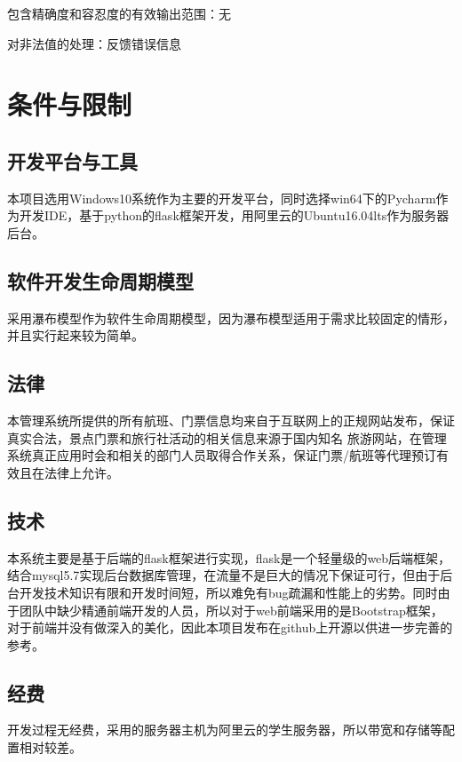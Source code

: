 		包含精确度和容忍度的有效输出范围：无

		对非法值的处理：反馈错误信息


\newpage
\section{条件与限制}
\subsection{开发平台与工具}
本项目选用Windows10系统作为主要的开发平台，同时选择win64下的Pycharm作为开发IDE，基于python的flask框架开发，用阿里云的Ubuntu16.04lts作为服务器后台。
\subsection{软件开发生命周期模型}
采用瀑布模型作为软件生命周期模型，因为瀑布模型适用于需求比较固定的情形，并且实行起来较为简单。
\subsection{法律}
本管理系统所提供的所有航班、门票信息均来自于互联网上的正规网站发布，保证真实合法，景点门票和旅行社活动的相关信息来源于国内知名
旅游网站，在管理系统真正应用时会和相关的部门人员取得合作关系，保证门票/航班等代理预订有效且在法律上允许。
\subsection{技术}
本系统主要是基于后端的flask框架进行实现，flask是一个轻量级的web后端框架，结合mysql5.7实现后台数据库管理，在流量不是巨大的情况下保证可行，但由于后台开发技术知识有限和开发时间短，所以难免有bug疏漏和性能上的劣势。同时由于团队中缺少精通前端开发的人员，所以对于web前端采用的是Bootstrap框架，对于前端并没有做深入的美化，因此本项目发布在github上开源以供进一步完善的参考。
\subsection{经费}
开发过程无经费，采用的服务器主机为阿里云的学生服务器，所以带宽和存储等配置相对较差。